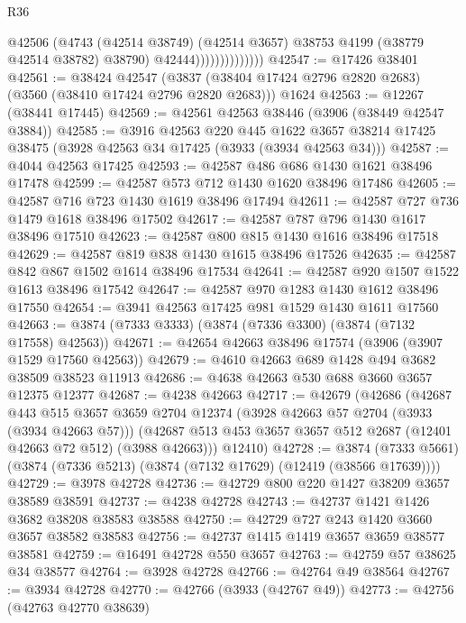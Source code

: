 \begin{lexlean}{R36}
\begin{coremodule}
                              @42506
                                (@4743
                                  (@42514 @38749)
                                  (@42514 @3657)
                                  @38753
                                  @4199
                                  (@38779 @42514 @38782)
                                  @38790)
                                @42444))))))))))))))
@42547 := @17426 @38401
@42561 := @38424
    @42547
    (@3837 (@38404 @17424 @2796 @2820 @2683) (@3560 (@38410 @17424 @2796 @2820 @2683)))
    @1624
@42563 := @12267 (@38441 @17445)
@42569 := @42561 @42563 @38446 (@3906 (@38449 @42547 @3884))
@42585 := @3916
    @42563
    @220
    @445
    @1622
    @3657
    @38214
    @17425
    @38475
    (@3928 @42563 @34 @17425 (@3933 (@3934 @42563 @34)))
@42587 := @4044 @42563 @17425
@42593 := @42587 @486 @686 @1430 @1621 @38496 @17478
@42599 := @42587 @573 @712 @1430 @1620 @38496 @17486
@42605 := @42587 @716 @723 @1430 @1619 @38496 @17494
@42611 := @42587 @727 @736 @1479 @1618 @38496 @17502
@42617 := @42587 @787 @796 @1430 @1617 @38496 @17510
@42623 := @42587 @800 @815 @1430 @1616 @38496 @17518
@42629 := @42587 @819 @838 @1430 @1615 @38496 @17526
@42635 := @42587 @842 @867 @1502 @1614 @38496 @17534
@42641 := @42587 @920 @1507 @1522 @1613 @38496 @17542
@42647 := @42587 @970 @1283 @1430 @1612 @38496 @17550
@42654 := @3941 @42563 @17425 @981 @1529 @1430 @1611 @17560
@42663 := @3874 (@7333 @3333) (@3874 (@7336 @3300) (@3874 (@7132 @17558) @42563))
@42671 := @42654 @42663 @38496 @17574 (@3906 (@3907 @1529 @17560 @42563))
@42679 := @4610 @42663 @689 @1428 @494 @3682 @38509 @38523 @11913
@42686 := @4638 @42663 @530 @688 @3660 @3657 @12375 @12377
@42687 := @4238 @42663
@42717 := @42679
    (@42686
      (@42687
        @443
        @515
        @3657
        @3659
        @2704
        @12374
        (@3928 @42663 @57 @2704 (@3933 (@3934 @42663 @57)))
        (@42687 @513 @453 @3657 @3657 @512 @2687 (@12401 @42663 @72 @512) (@3988 @42663)))
      @12410)
@42728 := @3874 (@7333 @5661) (@3874 (@7336 @5213) (@3874 (@7132 @17629) (@12419 (@38566 @17639))))
@42729 := @3978 @42728
@42736 := @42729 @800 @220 @1427 @38209 @3657 @38589 @38591
@42737 := @4238 @42728
@42743 := @42737 @1421 @1426 @3682 @38208 @38583 @38588
@42750 := @42729 @727 @243 @1420 @3660 @3657 @38582 @38583
@42756 := @42737 @1415 @1419 @3657 @3659 @38577 @38581
@42759 := @16491 @42728 @550 @3657
@42763 := @42759 @57 @38625 @34 @38577
@42764 := @3928 @42728
@42766 := @42764 @49 @38564
@42767 := @3934 @42728
@42770 := @42766 (@3933 (@42767 @49))
@42773 := @42756 (@42763 @42770 @38639)

\end{coremodule}
\end{lexlean}
